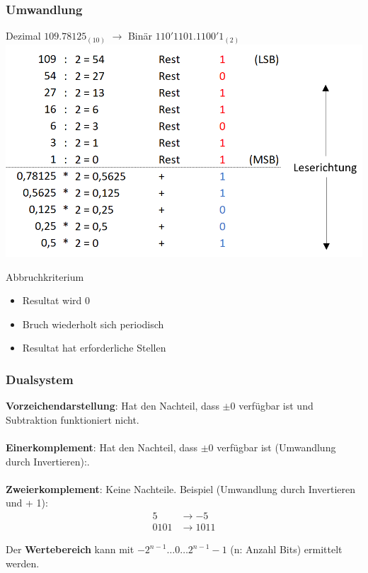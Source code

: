 \subsubsection{Umwandlung}
Dezimal $109.78125_{(10)}$ $\rightarrow$ Binär \textit{$110'1101.1100'1_{(2)}$} \\
\includegraphics[width=\columnwidth]{./Images/Umwandlung.png}

\noindent
Abbruchkriterium
\begin{itemize}[nosep]
	\item Resultat wird 0
	\item Bruch wiederholt sich periodisch
	\item Resultat hat erforderliche Stellen
\end{itemize}

\subsubsection{Dualsystem}
\noindent\textbf{Vorzeichendarstellung}:
Hat den Nachteil, dass $\pm0$ verfügbar ist und Subtraktion funktioniert nicht. \\ \\
\noindent\textbf{Einerkomplement}:
Hat den Nachteil, dass $\pm0$ verfügbar ist (Umwandlung durch Invertieren):. 
\\ \\
\noindent\textbf{Zweierkomplement}: Keine Nachteile.
Beispiel (Umwandlung durch Invertieren und + 1):
\begin{align*}
	5 &\rightarrow -5 \\
	0101 &\rightarrow 1011
\end{align*}

\noindent Der \textbf{Wertebereich} kann mit $-2^{n-1} \dots 0 \dots 2^{n-1}-1$ (n: Anzahl Bits) ermittelt werden.


